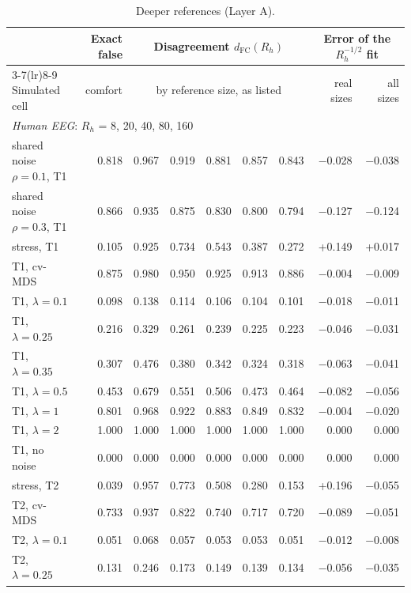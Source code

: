 \documentclass[11pt]{article}
\newcommand{\FC}{\mathrm{FC}}
\begin{document}
\begin{table}[!htb]
\centering\scriptsize
\caption{Deeper references (Layer A).}
\begin{tabular}{lrrrrrrrr}
\toprule
 & Exact false & \multicolumn{5}{c}{Disagreement $d_{\FC}(R_h)$} & \multicolumn{2}{c}{Error of the $R_h^{-1/2}$ fit} \\
\cmidrule(lr){3-7}\cmidrule(lr){8-9}
Simulated cell & comfort & \multicolumn{5}{c}{by reference size, as listed} & real sizes & all sizes \\
\midrule
\multicolumn{9}{l}{\textit{Human EEG}: $R_h$ = 8, 20, 40, 80, 160} \\
\quad shared noise $\rho=0.1$, T1 & 0.818 & 0.967 & 0.919 & 0.881 & 0.857 & 0.843 & $-$0.028 & $-$0.038 \\
\quad shared noise $\rho=0.3$, T1 & 0.866 & 0.935 & 0.875 & 0.830 & 0.800 & 0.794 & $-$0.127 & $-$0.124 \\
\quad stress, T1 & 0.105 & 0.925 & 0.734 & 0.543 & 0.387 & 0.272 & +0.149 & +0.017 \\
\quad T1, cv-MDS & 0.875 & 0.980 & 0.950 & 0.925 & 0.913 & 0.886 & $-$0.004 & $-$0.009 \\
\quad T1, $\lambda=0.1$ & 0.098 & 0.138 & 0.114 & 0.106 & 0.104 & 0.101 & $-$0.018 & $-$0.011 \\
\quad T1, $\lambda=0.25$ & 0.216 & 0.329 & 0.261 & 0.239 & 0.225 & 0.223 & $-$0.046 & $-$0.031 \\
\quad T1, $\lambda=0.35$ & 0.307 & 0.476 & 0.380 & 0.342 & 0.324 & 0.318 & $-$0.063 & $-$0.041 \\
\quad T1, $\lambda=0.5$ & 0.453 & 0.679 & 0.551 & 0.506 & 0.473 & 0.464 & $-$0.082 & $-$0.056 \\
\quad T1, $\lambda=1$ & 0.801 & 0.968 & 0.922 & 0.883 & 0.849 & 0.832 & $-$0.004 & $-$0.020 \\
\quad T1, $\lambda=2$ & 1.000 & 1.000 & 1.000 & 1.000 & 1.000 & 1.000 & 0.000 & 0.000 \\
\quad T1, no noise & 0.000 & 0.000 & 0.000 & 0.000 & 0.000 & 0.000 & 0.000 & 0.000 \\
\quad stress, T2 & 0.039 & 0.957 & 0.773 & 0.508 & 0.280 & 0.153 & +0.196 & $-$0.055 \\
\quad T2, cv-MDS & 0.733 & 0.937 & 0.822 & 0.740 & 0.717 & 0.720 & $-$0.089 & $-$0.051 \\
\quad T2, $\lambda=0.1$ & 0.051 & 0.068 & 0.057 & 0.053 & 0.053 & 0.051 & $-$0.012 & $-$0.008 \\
\quad T2, $\lambda=0.25$ & 0.131 & 0.246 & 0.173 & 0.149 & 0.139 & 0.134 & $-$0.056 & $-$0.035 \\

\end{tabular}
\end{table}
\end{document}
